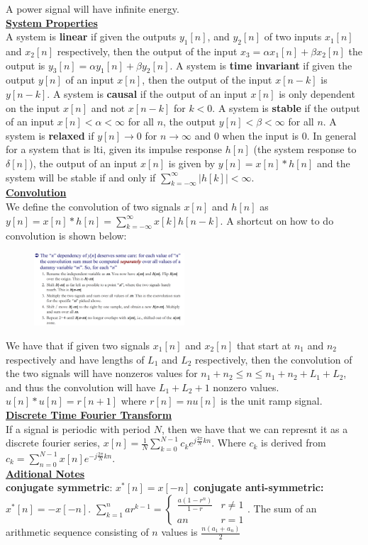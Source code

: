 \documentclass[9pt]{article}
\begin{document}
A power signal will have infinite energy.\\
\underline{\textbf{System Properties}}\\
A system is \textbf{linear} if given the outputs $y_1[n]$, and $y_2[n]$ of two inputs $x_1[n]$ and $x_2[n]$ respectively, 
then the output of the input $x_3=\alpha x_1[n]+\beta x_2[n]$ the output is $y_3[n]=\alpha y_1[n]+\beta y_2[n]$. 
A system is \textbf{time invariant} if given the output $y[n]$ of an input $x[n]$, then the output of the input $x[n-k]$ is $y[n-k]$. A system is \textbf{causal} if the output of an input $x[n]$ is only dependent on the input $x[n]$ and not $x[n-k]$ for $k<0$. 
A system is \textbf{stable} if the output of an input $x[n]<\alpha<\infty$ for all $n$, the output $y[n]<\beta<\infty$ for all $n$. A
system is \textbf{relaxed} if $y[n]\to0$ for $n\to\infty$ and $0$ when the input is $0$. In general
for a system that is lti, given its impulse response $h[n]$ (the system response to $\delta[n]$), the output of an input $x[n]$ is given by $y[n]=x[n]*h[n]$
and the system will be stable if and only if $\sum_{k=-\infty}^{\infty}|h[k]|<\infty$.\\
\underline{\textbf{Convolution}}\\
We define the convolution of two signals $x[n]$ and $h[n]$ as $\boxed{y[n]=x[n]*h[n]=\sum_{k=-\infty}^{\infty}x[k]h[n-k]}$. A shortcut on how to do 
convolution is shown below:\\
\begin{figure}
\includegraphics[width=0.5\textwidth]{convolution.png}
\end{figure}
We have that if given two signals $x_1[n]$ and $x_2[n]$ that start at $n_1$ and $n_2$ respectively and have lengths of 
$L_1$ and $L_2$ respectively, then the convolution of the two signals will have nonzeros values for $n_1+n_2\leq n\leq n_1+n_2+L_1+L_2$, and thus
the convolution will have $L_1+L_2+1$ nonzero values. $u[n]*u[n]=r[n+1]$ where $r[n]=nu[n]$ is the unit ramp signal.\\
\underline{\textbf{Discrete Time Fourier Transform}}\\
If a signal is periodic with period $N$, then we have that we can represnt it as a discrete fourier series, $\boxed{x[n]=\frac{1}{N}\sum_{k=0}^{N-1}c_ke^{j\frac{2\pi}{N}kn}}$. Where
$c_k$ is derived from $\boxed{c_k=\sum_{n=0}^{N-1}x[n]e^{-j\frac{2\pi}{N}kn}}$.\\
\underline{\textbf{Aditional Notes}}\\
\textbf{conjugate symmetric}: $x^*[n]=x[-n]$ \textbf{conjugate anti-symmetric:} $x^*[n]=-x[-n]$. $\boxed{\sum_{k=1}^n ar^{k-1}=\begin{cases}
\frac{a(1-r^n)}{1-r} & r\neq 1\\
an & r=1\end{cases}}$. The sum of an arithmetic sequence consisting of $n$ values is $\boxed{\frac{n(a_1+a_n)}{2}}$
\end{document}
